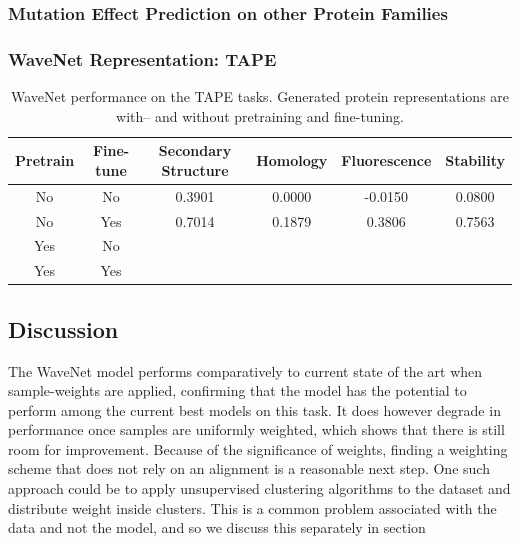 \subsubsection{Mutation Effect Prediction on other Protein Families}



\subsubsection{WaveNet Representation: TAPE}
\begin{table}[ht]
    \centering
    \begin{tabularx}{0.93\textwidth}{cccccc}
    \hline
    \textbf{Pretrain} & \textbf{Fine-tune} & \textbf{Secondary Structure} & \textbf{Homology} & \textbf{Fluorescence} & \textbf{Stability} \\ \hline
    No  & No  & 0.3901 & 0.0000 & -0.0150 & 0.0800 \\
    No  & Yes & 0.7014 & 0.1879 & 0.3806 & 0.7563 \\
    Yes & No  & & & & \\
    Yes & Yes & & & & \\
    \hline
    \end{tabularx}
    \caption{WaveNet performance on the TAPE tasks. Generated protein representations are with-- and without pretraining and fine-tuning.}
    \label{tab:wavenet_tape_results}
\end{table}

\subsection{Discussion}
\label{sec:wavenet_discussion}
The WaveNet model performs comparatively to current state of the art  when sample-weights are applied, confirming that the model has the potential to perform among the current best models on this task. It does however degrade in performance once samples are uniformly weighted, which shows that there is still room for improvement. Because of the significance of weights, finding a weighting scheme that does not rely on an alignment is a reasonable next step. One such approach could be to apply unsupervised clustering algorithms to the dataset and distribute weight inside clusters. This is a common problem associated with the data and not the model, and so we discuss this separately in section 

